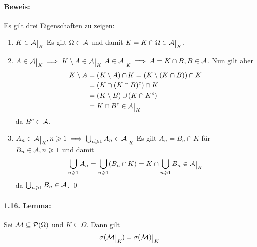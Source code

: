 \documentclass[12pt]{report}
\begin{document}
\paragraph{Beweis:}Es gilt drei Eigenschaften zu zeigen:
\begin{enumerate}[label=(\roman*)]
    \item $K\in\A\krestr{K}$\newline
    Es gilt $\Omega\in\mathcal{A}$ und damit $K=K\cap\Omega\in \A\krestr{K}$.
    \item $A\in\A\krestr{K}\implies K\setminus A\in\A\krestr{K}$\newline
    $A\in\A\krestr{K}\implies A=K\cap B,B\in\A$. Nun gilt aber 
    \begin{align*}
        K\setminus A&=(K\setminus A)\cap K=(K\setminus(K\cap B))\cap K\\
        &=(K\cap(K\cap B)^c)\cap K\\
        &=(K\setminus B)\cup(K\cap K^c)\\
        &=K\cap B^c\in \A\krestr{K}
    \end{align*}
    da $B^c\in\mathcal{A}$.
    \item $A_n\in\A\krestr{K},n\geq1\implies\bigcup_{n\geq1}A_n\in\A\krestr{K}$\newline
    Es gilt $A_n=B_n\cap K$ f\"ur $B_n\in\mathcal{A}, n\geqslant1$ und damit
    $$\bigcup_{n\geq1}A_n=\bigcup_{n\geq1}(B_n\cap K)=K\cap\bigcup_{n\geq1}B_n\in\A\krestr{K}$$
    da $\bigcup_{n\geqslant1}B_n\in\mathcal{A}$. \qed
\end{enumerate}

\paragraph{1.16. Lemma:}Sei $\mathcal{M}\subseteq\mathcal{P}(\Omega)$ und $K\subseteq\Omega$. Dann gilt 
$$\sigma(\M\krestr{K})=\sigma(\M)\krestr{K}$$
\end{document}
